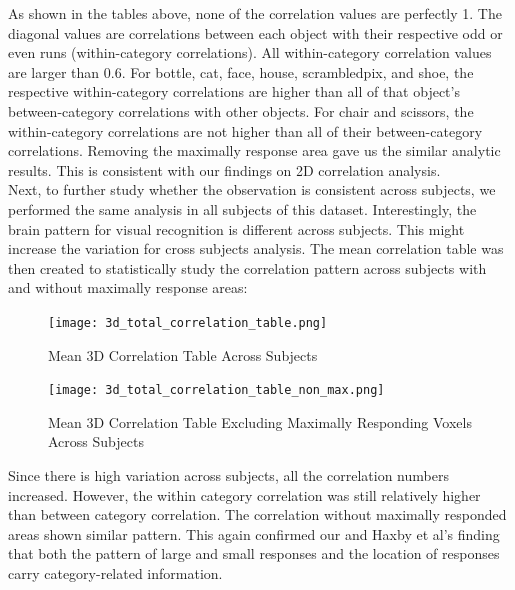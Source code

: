 \documentclass[11pt,twocolumn]{article}
\begin{document}
As shown in the tables above, none of the correlation values are perfectly 1. 
The diagonal values are correlations between each object with their 
respective odd or 
even runs (within-category correlations). All within-category correlation 
values are larger than 0.6. For bottle, cat, face, house, scrambledpix, 
and shoe, the respective within-category correlations are higher than 
all of that object's between-category correlations with other objects.
For chair and scissors, the within-category correlations are not higher 
than all of their between-category correlations. Removing the maximally 
response area gave us the similar analytic results. This is consistent
with our findings on 2D correlation analysis.\\

Next, to further study whether the observation is consistent across subjects,
we performed the same analysis in all subjects of this dataset.
Interestingly, the brain pattern for visual recognition is different across
subjects. This might increase the variation for cross subjects analysis.
The mean correlation table was then created to statistically study the 
correlation pattern across subjects with and without maximally response areas:

\begin{figure}[h!]                                                              
\centering                                                                      
\texttt{[image: 3d\_total\_correlation\_table.png]}                   
\caption{Mean 3D Correlation Table Across Subjects}
\end{figure}                                                                    
                                                                                
\begin{figure}[h!]                                                              
\centering                                                                      
\texttt{[image: 3d\_total\_correlation\_table\_non\_max.png]}           
\caption{Mean 3D Correlation Table Excluding Maximally Responding Voxels Across
Subjects}    
\end{figure} 

Since there is high variation across subjects, all the correlation numbers
increased. However, the within category correlation was still relatively 
higher than between category correlation. The correlation without maximally
responded areas shown similar pattern. This again confirmed our and 
Haxby et al’s finding that both the pattern of   
large and small responses and the location of responses carry category-related  
information.\\
\end{document}
